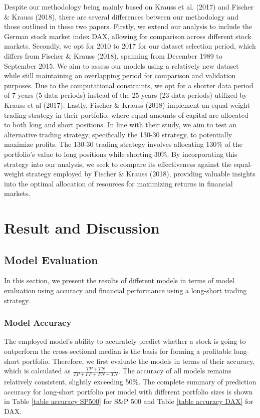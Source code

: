 \documentclass{article}
\begin{document}
Despite our methodology being mainly based on Krauss et al. (2017) and Fischer \& Krauss (2018), there are several differences between our methodology and those outlined in these two papers. Firstly, we extend our analysis to include the German stock market index DAX, allowing for comparison across different stock markets. Secondly, we opt for 2010 to 2017 for our dataset selection period, which differs from Fischer \& Krauss (2018), spanning from December 1989 to September 2015. We aim to assess our models using a relatively new dataset while still maintaining an overlapping period for comparison and validation purposes. Due to the computational constraints, we opt for a shorter data period of 7 years (5 data periods) instead of the 25 years (23 data periods) utilized by Krauss et al (2017). Lastly, Fischer \& Krauss (2018) implement an equal-weight trading strategy in their portfolio, where equal amounts of capital are allocated to both long and short positions. In line with their study, we aim to test an alternative trading strategy, specifically the 130-30 strategy, to potentially maximize profits. The 130-30 trading strategy involves allocating 130\% of the portfolio's value to long positions while shorting 30\%. By incorporating this strategy into our analysis, we seek to compare its effectiveness against the equal-weight strategy employed by Fischer \& Krauss (2018), providing valuable insights into the optimal allocation of resources for maximizing returns in financial markets.

\section{Result and Discussion}
\label{resultAndDiscussion}

\subsection{Model Evaluation}
In this section, we present the results of different models in terms of model evaluation using accuracy and financial performance using a long-short trading strategy.

\subsubsection{Model Accuracy}
The employed model's ability to accurately predict whether a stock is going to outperform the cross-sectional median is the basis for forming a profitable long-short portfolio. Therefore, we first evaluate the models in terms of their accuracy, which is calculated as $\frac{TP + TN}{TP + FP + FN + TN}$. The accuracy of all models remains relatively consistent, slightly exceeding 50\%. The complete summary of prediction accuracy for long-short portfolio per model with different portfolio sizes is shown in Table \ref{table accuracy SP500} for S\&P 500 and Table \ref{table accuracy DAX} for DAX. 
\end{document}
